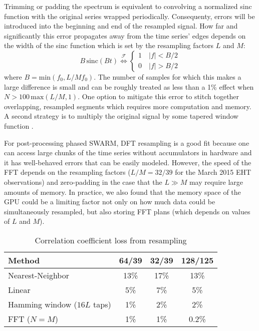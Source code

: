 Trimming or padding the spectrum is equivalent to convolving a normalized sinc function with the original series 
wrapped periodically.  Consequenty, errors will be introduced into the beginning and end of the
resampled signal.  How far and significantly this error propagates away from the time series' edges depends 
on the width of the sinc function which is set by the resampling factors $L$ and $M$: 
\begin{equation} \label{eq:sinc}
B\,\mathrm{sinc}(B t) \overset{\mathcal{F}}{\Longleftrightarrow} \begin{cases} 1 \quad |f| < B/2 \\ 0 \quad |f| > B/2 \end{cases}
\end{equation}
where $B = \mathrm{min}(f_0,L/Mf_0)$.  
The number of samples for which this makes a large difference is small and can be roughly treated as less than a 
1\% effect when $N > 100\,\mathrm{max}(L/M,1)$.  One option to mitigate this error to stitch together 
overlapping, resampled segments \citep{bi11} which requires more computation and memory.  A second strategy is to 
multiply the original signal by some tapered window function \citep{fraser89}.

For post-processing phased SWARM, DFT resampling is a good fit because one can access large chunks of 
the time series without accumulators in hardware and it has well-behaved errors
that can be easily modeled.  However, the speed of the FFT depends on the resampling factors ($L/M = 32/39$ for 
the March 2015 EHT observations) and zero-padding in the case that the $L\gg M$ may require large amounts of 
memory.  In practice, we also found that the memory space of the GPU could be a limiting factor not only 
on how much data could be simultaneously resampled, but also storing FFT plans (which depends on
values of $L$ and $M$).

\begin{table}
\begin{center}
\centering
\caption{Correlation coefficient loss from resampling \label{tab:loss}}
\begin{threeparttable}
\begin{tabular}{l|ccc}
\toprule
Method & 64/39 & 32/39 & 128/125 \\
\midrule
Nearest-Neighbor            & 13\% & 17\% & 13\% \\
Linear                      &  5\% &  7\% &  5\% \\
Hamming window ($16L$ taps) &  1\% &  2\% &  2\% \\
FFT ($N=M$)                 &  1\% &  1\% & 0.2\% \\
\bottomrule
\end{tabular}
\end{threeparttable}
\end{center}
\end{table}

